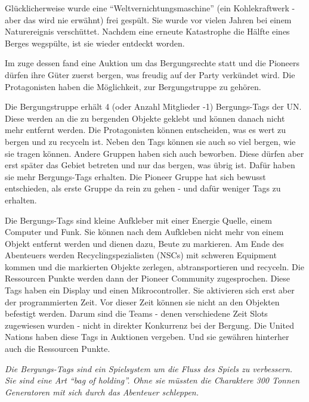 Glücklicherweise wurde eine \enquote{Weltvernichtungsmaschine} (ein Kohlekraftwerk - aber das wird nie erwähnt) frei gespült. Sie wurde vor vielen Jahren bei einem Naturereignis verschüttet. Nachdem eine erneute Katastrophe die Hälfte eines Berges wegspülte, ist sie wieder entdeckt worden.

Im zuge dessen fand eine Auktion um das Bergungsrechte statt und die Pioneers dürfen ihre Güter zuerst bergen, was freudig auf der Party verkündet wird. Die Protagonisten haben die Möglichkeit, zur Bergungstruppe zu gehören.

Die Bergungstruppe erhält 4 (oder Anzahl Mitglieder -1) Bergungs-Tags der UN. Diese werden an die zu bergenden Objekte geklebt und können danach nicht mehr entfernt werden. Die Protagonisten können entscheiden, was es wert zu bergen und zu recyceln ist. Neben den Tags können sie auch so viel bergen, wie sie tragen können.
Andere Gruppen haben sich auch beworben. Diese dürfen aber erst später das Gebiet betreten und nur das bergen, was übrig ist. Dafür haben sie mehr Bergungs-Tags erhalten. Die Pioneer Gruppe hat sich bewusst entschieden, als erste Gruppe da rein zu gehen - und dafür weniger Tags zu erhalten.

\begin{sidebarBox}[title=Bergungs-Tags]
Die Bergungs-Tags sind kleine Aufkleber mit einer Energie Quelle, einem Computer und Funk. Sie können nach dem Aufkleben nicht mehr von einem Objekt entfernt werden und dienen dazu, Beute zu markieren. Am Ende des Abenteuers werden Recyclingspezialisten (NSCs) mit schweren Equipment kommen und die markierten Objekte zerlegen, abtransportieren und recyceln. Die Ressourcen Punkte werden dann der Pioneer Community zugesprochen.
Diese Tags haben ein Display und einen Mikrocontroller. Sie aktivieren sich erst aber der programmierten Zeit. Vor dieser Zeit können sie nicht an den Objekten befestigt werden. Darum sind die Teams - denen verschiedene Zeit Slots zugewiesen wurden - nicht in direkter Konkurrenz bei der Bergung.
Die United Nations haben diese Tags in Auktionen vergeben. Und sie gewähren hinterher auch die Ressourcen Punkte.
\end{sidebarBox}

\emph{Die Bergungs-Tags sind ein Spielsystem um die Fluss des Spiels zu verbessern. Sie sind eine Art \enquote{bag of holding}. Ohne sie müssten die Charaktere 300 Tonnen Generatoren mit sich durch das Abenteuer schleppen.}


